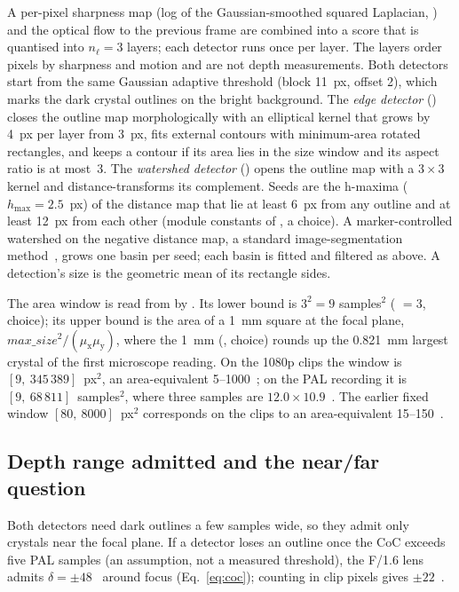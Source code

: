 A per-pixel sharpness map (log of the Gaussian-smoothed squared Laplacian, ) and the optical
flow to the previous frame are combined into a score that is quantised into $n_\ell = 3$ layers; each detector runs
once per layer. The layers order pixels by sharpness and motion and are not depth measurements. Both detectors start
from the same Gaussian adaptive threshold (block 11~px, offset 2), which marks the dark crystal outlines on the bright
background. The \emph{edge detector} () closes the outline map morphologically with an
elliptical kernel that grows by 4~px per layer from 3~px, fits external contours with minimum-area rotated rectangles,
and keeps a contour if its area lies in the size window and its aspect ratio is at most~3. The \emph{watershed
detector} () opens the outline map with a $3 \times 3$ kernel and distance-transforms its
complement. Seeds are the h-maxima ($h_\mathrm{max} = 2.5$~px) of the distance map that lie at least 6~px from any
outline and at least 12~px from each other (module constants of , a choice). A marker-controlled watershed on the negative
distance map, a standard image-segmentation method~\citep{Vincent1991,BeucherMeyer1993}, grows one basin per seed;
each basin is fitted and filtered as above. A detection's size is the geometric mean of its rectangle sides.


\label{sec:window}The area window is read from  by
. Its lower bound is $3^2 = 9$ samples$^2$ ( $= 3$, choice);
its upper bound is the area of a 1~mm square at the focal plane, $\mathit{max\_size}^2 / (\mu_\mathrm{x} \mu_\mathrm{y})$, where the 1~mm
(, choice) rounds up the 0.821~mm largest crystal of the first microscope reading. On the 1080p clips
the window is $[9,\ 345\,389]$~px$^2$, an area-equivalent 5--1000~\um; on the PAL recording it is
$[9,\ 68\,811]$~samples$^2$, where three samples are $12.0 \times 10.9$~\um. The earlier fixed window
$[80,\ 8000]$~px$^2$ corresponds on the clips to an area-equivalent 15--150~\um.

\subsection{Depth range admitted and the near/far question}\label{sec:selectivity}

Both detectors need dark outlines a few samples wide, so they admit only crystals near the focal plane. If a detector
loses an outline once the CoC exceeds five PAL samples (an assumption, not a measured threshold), the F/1.6 lens
admits $\delta = \pm 48$~\um{} around focus (Eq.~\ref{eq:coc}); counting in clip pixels gives $\pm 22$~\um.

